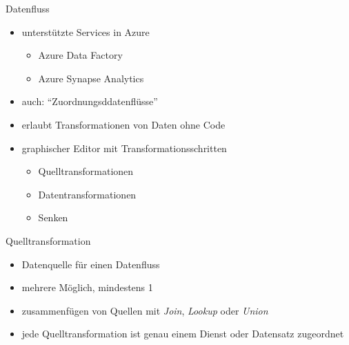 

\begin{flashcard}[Definition]{Datenfluss}
  \begin{itemize}
    \item unterstützte Services in Azure
      \begin{itemize}
        \item Azure Data Factory
        \item Azure Synapse Analytics
      \end{itemize}
    \item auch: ``Zuordnungsddatenflüsse''
    \item erlaubt Transformationen von Daten ohne Code
    \item graphischer Editor mit Transformationsschritten
      \begin{itemize}
        \item Quelltransformationen
        \item Datentransformationen
        \item Senken
      \end{itemize}
  \end{itemize}
\end{flashcard}

\begin{flashcard}[Definition]{Quelltransformation}
  \begin{itemize}
    \item Datenquelle für einen Datenfluss
    \item mehrere Möglich, mindestens 1
    \item zusammenfügen von Quellen mit \emph{Join}, \emph{Lookup} oder \emph{Union}
    \item jede Quelltransformation ist genau einem Dienst oder Datensatz zugeordnet
  \end{itemize}
\end{flashcard}

